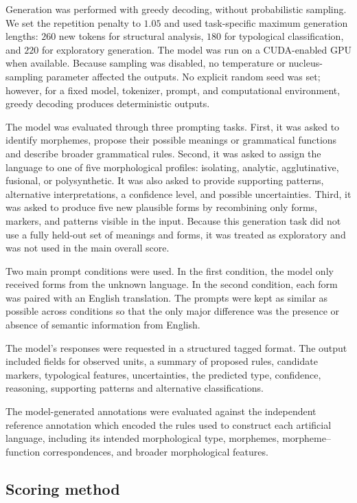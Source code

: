 \documentclass[11pt]{article}
\begin{document}
Generation was performed with greedy decoding, without probabilistic sampling. We set the repetition penalty to $1.05$ and used task-specific maximum generation lengths: $260$ new tokens for structural analysis, $180$ for typological classification, and $220$ for exploratory generation. The model was run on a CUDA-enabled GPU when available. Because sampling was disabled, no temperature or nucleus-sampling parameter affected the outputs. No explicit random seed was set; however, for a fixed model, tokenizer, prompt, and computational environment, greedy decoding produces deterministic outputs.

The model was evaluated through three prompting tasks. First, it was asked to identify morphemes, propose their possible meanings or grammatical functions and describe broader grammatical rules. Second, it was asked to assign the language to one of five morphological profiles: isolating, analytic, agglutinative, fusional, or polysynthetic. It was also asked to provide supporting patterns, alternative interpretations, a confidence level, and possible uncertainties. Third, it was asked to produce five new plausible forms by recombining only forms, markers, and patterns visible in the input. Because this generation task did not use a fully held-out set of meanings and forms, it was treated as exploratory and was not used in the main overall score.

Two main prompt conditions were used. In the first condition, the model only received forms from the unknown language. In the second condition, each form was paired with an English translation. The prompts were kept as similar as possible across conditions so that the only major difference was the presence or absence of semantic information from English.

The model's responses were requested in a structured tagged format. The output included fields for observed units, a summary of proposed rules, candidate markers, typological features, uncertainties, the predicted type, confidence, reasoning, supporting patterns and alternative classifications.~

The model-generated annotations were evaluated against the independent reference annotation which encoded the rules used to construct each artificial language, including its intended morphological type, morphemes, morpheme--function correspondences, and broader morphological features.

\subsection{Scoring method}
\end{document}
